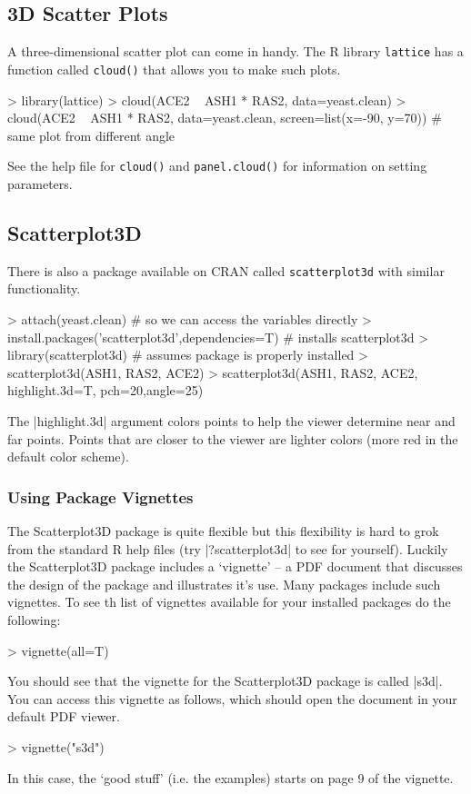 \subsection{3D Scatter Plots}

A three-dimensional scatter plot can come in handy. The R library
\lstinline!lattice! has a function called \lstinline!cloud()! that
allows you to make such plots.
\begin{R}
> library(lattice)
> cloud(ACE2 ~ ASH1 * RAS2, data=yeast.clean)
> cloud(ACE2 ~ ASH1 * RAS2, data=yeast.clean, screen=list(x=-90, y=70)) # same plot from different angle
\end{R}
See the help file for \lstinline!cloud()! and \lstinline!panel.cloud()! for information on setting parameters.

\subsection{Scatterplot3D}
There is also a package available on CRAN called \lstinline!scatterplot3d! with similar functionality.
%
\begin{R}
> attach(yeast.clean) # so we can access the variables directly
> install.packages('scatterplot3d',dependencies=T) # installs scatterplot3d
> library(scatterplot3d) # assumes package is properly installed
> scatterplot3d(ASH1, RAS2, ACE2)
> scatterplot3d(ASH1, RAS2, ACE2, highlight.3d=T, pch=20,angle=25)
\end{R}
%
The |highlight.3d| argument colors points to help the viewer determine near and far points. Points that are closer to the viewer are lighter colors (more red in the default color scheme).

\subsubsection{Using Package Vignettes}
The Scatterplot3D package is quite flexible but this flexibility is hard to grok from the standard R help files (try |?scatterplot3d| to see for yourself).  Luckily the Scatterplot3D package includes a `vignette' -- a PDF document that discusses the design of the package and illustrates it's use.  Many packages include such vignettes. To see th list of vignettes available for your installed packages do the following:
%
\begin{R}
> vignette(all=T)
\end{R}
%
You should see that the vignette for the Scatterplot3D package is called |s3d|. You can access this vignette as follows, which should open the document in your default PDF viewer.
\begin{R}
> vignette("s3d")
\end{R}
%
In this case, the `good stuff' (i.e. the examples) starts on page 9 of the vignette.

